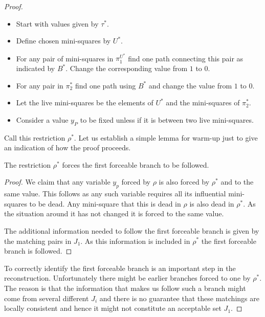 \documentclass{article}\usepackage[a4paper,margin=20mm]{geometry}
\begin{document}
\begin{proof}
\begin{itemize}

\item Start with values given by $\tau^*$.

\item Define chosen mini-squares by $U^*$.

\item For any pair of mini-squares in $\pi_1^{U^*}$ 
find one path connecting this pair as
indicated by $B^*$.  Change the corresponding value
from $1$ to $0$.

\item For any pair in $\pi_2^*$ find one
path using $B^*$ and change the value from $1$ to
$0$.

\item Let the live mini-squares be the elements of
$U^*$ and the mini-squares of $\pi_2^*$.

\item Consider a value $y_P$ to be fixed unless if
it is between two live mini-squares.

\end{itemize}

Call this restriction $\rho^*$.  Let us establish
a simple lemma for warm-up just to give an indication
of how the proof proceeds.

\begin{lemma}
The restriction $\rho^*$ forces the first forceable branch
to be followed.  
\end{lemma}

\begin{proof}
We claim that any variable $y_p$ forced by $\rho$ is also forced by $\rho^*$
and to the same value.
This follows as any such variable requires all
its influential mini-squares to be dead.  Any mini-square
that this is dead in $\rho$ is also dead in $\rho^*$.  As the 
situation around it has not changed it is forced to the same
value.

The additional information needed to follow the first forceable branch
is given by the matching pairs in $J_1$.  As this information is included in
$\rho^*$ the first forceable branch is followed.
\end{proof}

To correctly identify the first forceable branch is an important 
step in the reconstruction.  Unfortunately there might be earlier
branches forced to one by $\rho^*$.  The reason is that the
information that makes us follow such a branch might come
from several different $J_i$ and there is no guarantee
that these matchings are locally consistent and hence
it might not constitute an acceptable set $J_1$.  


\end{proof}
\end{document}
